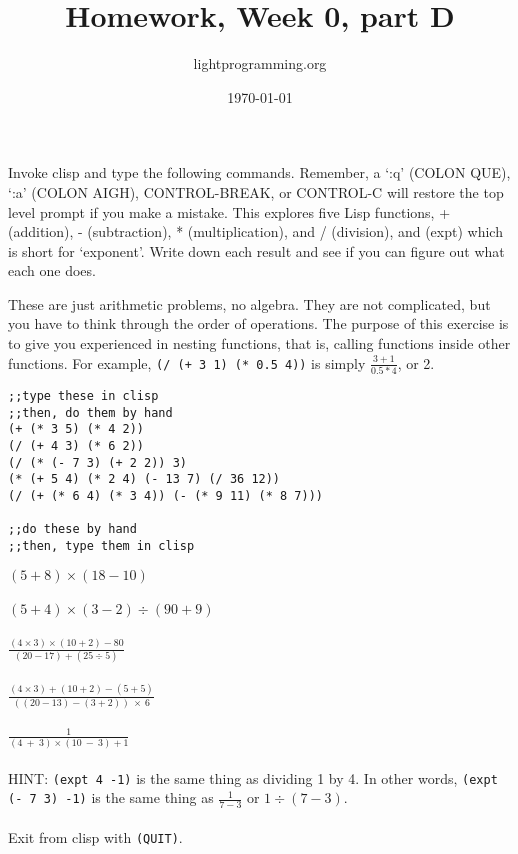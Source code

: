 \documentclass{article}
\title{Homework, Week 0, part D}
\author{lightprogramming.org}
\date{\today}
\begin{document}
\maketitle{}
\lstset{language=Lisp}

Invoke clisp and type the following commands. Remember, a `:q' (COLON QUE), `:a' (COLON AIGH), CONTROL-BREAK, or CONTROL-C will restore the top level prompt if you make a mistake. This explores five Lisp functions, + (addition), - (subtraction), * (multiplication), and / (division), and (expt) which is short for `exponent'. Write down each result and see if you can figure out what each one does.

These are just arithmetic problems, no algebra. They are not complicated, but you have to think through the order of operations. The purpose of this exercise is to give you experienced in nesting functions, that is, calling functions inside other functions. For example, \texttt{(/ (+ 3 1) (* 0.5 4))} is simply $\frac{3 + 1}{0.5 * 4}$, or 2.

\begin{lstlisting}
;;type these in clisp
;;then, do them by hand
(+ (* 3 5) (* 4 2))
(/ (+ 4 3) (* 6 2))
(/ (* (- 7 3) (+ 2 2)) 3)
(* (+ 5 4) (* 2 4) (- 13 7) (/ 36 12))
(/ (+ (* 6 4) (* 3 4)) (- (* 9 11) (* 8 7)))

;;do these by hand
;;then, type them in clisp
\end{lstlisting}
$(5 + 8) \times (18 - 10)$ \\
\\
$(5 + 4) \times (3 - 2) \div (90 + 9)$\\
\\
$\frac{(4 \times 3) \times (10 + 2) - 80}{(20 - 17) + (25 \div 5)}$ \\
\\
$\frac{(4 \times 3) + (10 + 2) - (5 + 5)}{((20 - 13) - (3 + 2)) \: \times \: 6}$ \\
\\
$\frac{1}{( 4 \: + \: 3) \times (10 \:- \:    3) + 1}$ \\
\\
HINT: \texttt{(expt 4 -1)} is the same thing as dividing 1 by 4. In other words, \texttt{(expt (- 7 3) -1)} is the same thing as $\frac{1}{7 - 3}$ or $1 \div (7 - 3)$. \\


\paragraph{}Exit from clisp with \texttt{(QUIT)}.
\end{document}
